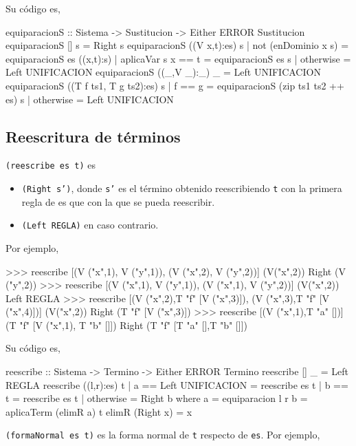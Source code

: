 Su código es,
\begin{codigo}
equiparacionS :: Sistema -> Sustitucion -> Either ERROR Sustitucion
equiparacionS [] s = Right s
equiparacionS ((V x,t):es) s 
    | not (enDominio x s)   = equiparacionS es ((x,t):s)
    | aplicaVar s x == t    = equiparacionS es s
    | otherwise             = Left UNIFICACION
equiparacionS ((_,V _):_) _ = Left UNIFICACION
equiparacionS ((T f ts1, T g ts2):es) s 
    | f == g    = equiparacionS (zip ts1 ts2 ++ es) s
    | otherwise = Left UNIFICACION
\end{codigo}

\subsection{Reescritura de términos}

 \texttt{(reescribe es t)} es
\begin{itemize}
\item \texttt{(Right s')}, donde \texttt{s'} es el término obtenido
  reescribiendo \texttt{t} con la primera regla de es que con la que
  se pueda reescribir.
\item \texttt{(Left REGLA)} en caso contrario.
\end{itemize}
Por ejemplo,
\begin{sesion}
>>> reescribe [(V ("x",1), V ("y",1)),
                 (V ("x",2), V ("y",2))]
                 (V("x",2))
Right (V ("y",2))
>>> reescribe [(V ("x",1), V ("y",1)),
                 (V ("x",1), V ("y",2))]
                 (V("x",2))
Left REGLA
>>> reescribe [(V ("x",2),T "f" [V ("x",3)]),
                 (V ("x",3),T "f" [V ("x",4)])]
                 (V("x",2))
Right (T "f" [V ("x",3)])
>>> reescribe [(V ("x",1),T "a" [])]
                 (T "f" [V ("x",1), T "b" []])
Right (T "f" [T "a" [],T "b" []])
\end{sesion}

Su código es,
\begin{codigo}
reescribe :: Sistema -> Termino -> Either ERROR Termino
reescribe [] _ = Left REGLA
reescribe ((l,r):es) t
    | a == Left UNIFICACION = reescribe es t
    | b == t = reescribe es t
    | otherwise = Right b
    where a = equiparacion l r
          b = aplicaTerm (elimR a) t
          elimR (Right x) = x
\end{codigo}
 
 \texttt{(formaNormal es t)} es la forma normal de \texttt{t} respecto
de \texttt{es}. Por ejemplo,

